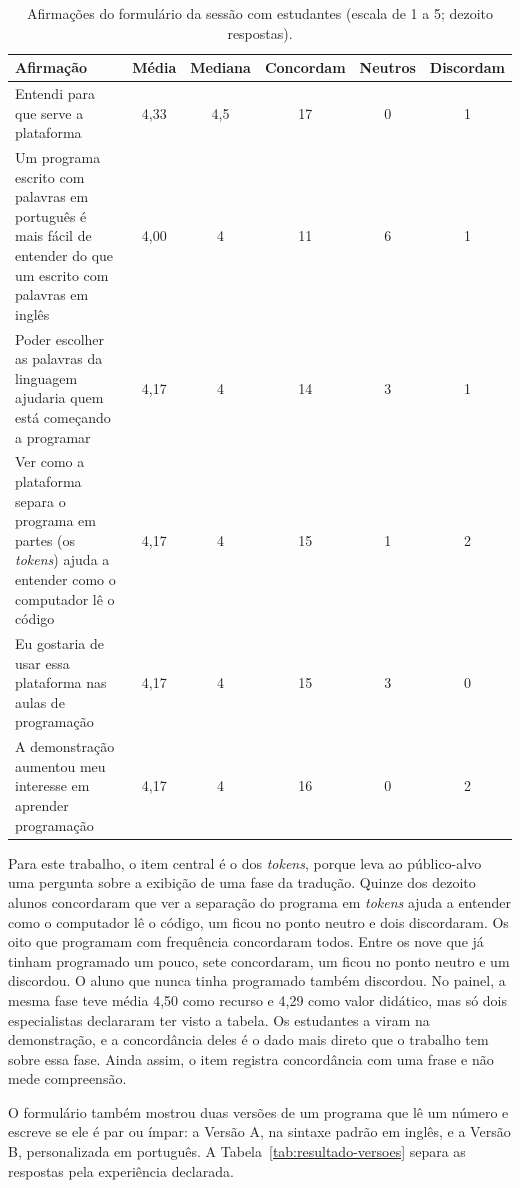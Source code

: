 \begin{table}[htbp]
\centering
\caption{Afirmações do formulário da sessão com estudantes (escala de 1 a 5; dezoito respostas).}
\label{tab:resultado-estudantes}
\footnotesize
\renewcommand{\arraystretch}{1.2}
\begin{tabular}{|p{6.3cm}|c|c|c|c|c|}
\hline
\textbf{Afirmação} & \textbf{Média} & \textbf{Mediana} & \textbf{Concordam} & \textbf{Neutros} & \textbf{Discordam} \\\hline
Entendi para que serve a plataforma & 4,33 & 4,5 & 17 & 0 & 1 \\\hline
Um programa escrito com palavras em português é mais fácil de entender do que um escrito com palavras em inglês & 4,00 & 4 & 11 & 6 & 1 \\\hline
Poder escolher as palavras da linguagem ajudaria quem está começando a programar & 4,17 & 4 & 14 & 3 & 1 \\\hline
Ver como a plataforma separa o programa em partes (os \textit{tokens}) ajuda a entender como o computador lê o código & 4,17 & 4 & 15 & 1 & 2 \\\hline
Eu gostaria de usar essa plataforma nas aulas de programação & 4,17 & 4 & 15 & 3 & 0 \\\hline
A demonstração aumentou meu interesse em aprender programação & 4,17 & 4 & 16 & 0 & 2 \\\hline
\end{tabular}
\end{table}

Para este trabalho, o item central é o dos \textit{tokens}, porque leva ao público-alvo uma pergunta sobre a exibição de uma fase da tradução. Quinze dos dezoito alunos concordaram que ver a separação do programa em \textit{tokens} ajuda a entender como o computador lê o código, um ficou no ponto neutro e dois discordaram. Os oito que programam com frequência concordaram todos. Entre os nove que já tinham programado um pouco, sete concordaram, um ficou no ponto neutro e um discordou. O aluno que nunca tinha programado também discordou. No painel, a mesma fase teve média 4,50 como recurso e 4,29 como valor didático, mas só dois especialistas declararam ter visto a tabela. Os estudantes a viram na demonstração, e a concordância deles é o dado mais direto que o trabalho tem sobre essa fase. Ainda assim, o item registra concordância com uma frase e não mede compreensão.

O formulário também mostrou duas versões de um programa que lê um número e escreve se ele é par ou ímpar: a Versão A, na sintaxe padrão em inglês, e a Versão B, personalizada em português. A Tabela~\ref{tab:resultado-versoes} separa as respostas pela experiência declarada.

